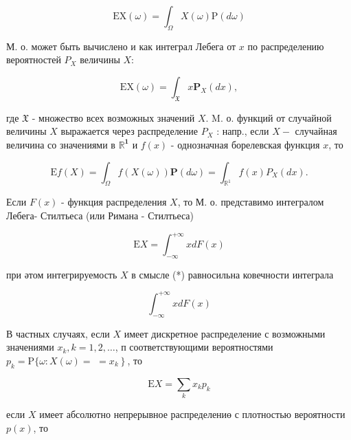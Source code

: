 \documentclass[10pt]{article}
\begin{document}
\[

\mathrm{EX}(\omega)=\int_{\Omega} X(\omega) \mathrm{P}(d \omega)

\]



М. о. может быть вычислено и как интеграл Лебега от $x$ по распределению вероятностей $P_{X}$ величины $X:$



\[

\mathrm{EX}(\omega)=\int_{\mathfrak{X}} x \boldsymbol{P}_{X}(d x),

\]



где $\mathfrak{X}$ - множество всех возможных значений $X$. M. о. функций от случайной величины $X$ выражается через распределение $P_{X}$ : напр., если $X-$ случайная величина со значениями в $\mathbb{R}^{\mathbf{1}}$ и $f(x)$ - однозначная борелевская функция $x$, то



\[

\mathrm{E} f(X)=\int_{\Omega} f(X(\omega)) \mathbf{P}(d \omega)=\int_{\mathbb{R}^{1}} f(x) P_{X}(d x) .

\]



Если $F(x)$ - функция распределения $X$, то М. $о$. представимо интегралом Лебега- Стилтьеса (или Римана - Стилтьеса)



\[

\mathrm{E} X=\int_{-\infty}^{+\infty} x d F(x)

\]



при әтом интегрируемость $X$ в смысле (*) равносильна ковечности интеграла



\[

\int_{-\infty}^{+\infty} x d F(x)

\]



В частных случаях, если $X$ имеет дискретное распределение с возможными значениями $x_{k}, k=1,2, \ldots$, п соответствующими вероятностями $p_{k}=\mathrm{P}\{\omega: X(\omega)=$ $\left.=x_{k}\right\}$, то



\[

\mathrm{E} X=\sum_{k} x_{k} p_{k}

\]



если $X$ имеет абсолютно непрерывное распределениө с плотностью вероятности $p(x)$, то
\end{document}

